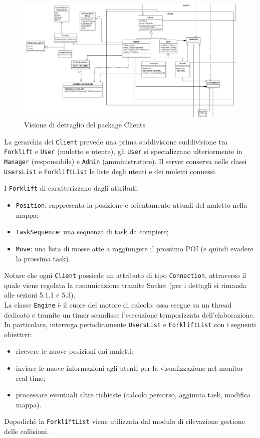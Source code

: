 \begin{figure}[H]
	\centering
	\includegraphics[scale=0.40]{res/diagrams/server/server_pack_clients.jpg}
	\caption{Visione di dettaglio del package Clients}
\end{figure}

La gerarchia dei \texttt{Client} prevede una prima suddivisione suddivisione tra \texttt{Forklift} e \texttt{User} (muletto e utente), gli \texttt{User} si specializzano ulteriormente in \texttt{Manager} (responsabile) e \texttt{Admin} (amministratore). Il server conserva nelle classi \texttt{UsersList} e \texttt{ForkliftList} le liste degli utenti e dei muletti connessi.

I \texttt{Forklift} di caratterizzano dagli attributi:
\begin{itemize}
	\item \texttt{Position}: rappresenta la posizione e orientamento attuali del muletto nella mappa;
	\item \texttt{TaskSequence}: una sequenza di task da compiere;
	\item \texttt{Move}: una lista di mosse atte a raggiungere il prossimo POI (e quindi evadere la prossima task).
\end{itemize} 

Notare che ogni \texttt{Client} possiede un attributo di tipo \texttt{Connection}, attraverso il quale viene regolata la comunicazione tramite Socket (per i dettagli si rimanda alle sezioni 5.1.1 e 5.3).\\

La classe \texttt{Engine} è il cuore del motore di calcolo: essa esegue su un thread dedicato e tramite un timer scandisce l'esecuzione temporizzata dell'elaborazione. In particolare, interroga periodicamente \texttt{UsersList} e \texttt{ForkliftList} con i seguenti obiettivi:
\begin{itemize}
	\item ricevere le nuove posizioni dai muletti;
	\item inviare le nuove informazioni agli utenti per la visualizzazione nel monitor real-time;
	\item processare eventuali altre richieste (calcolo percorso, aggiunta task, modifica mappa).
\end{itemize}
Dopodichè la \texttt{ForkliftList} viene utilizzata dal modulo di rilevazione gestione delle collisioni.

